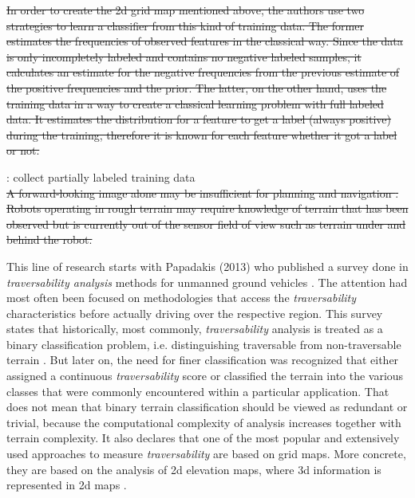 \documentclass[12pt,a4paper]{report}
\newcommand{\term}{\textit}
\begin{document}
	
	
	
	\sout{In order to create the 2d grid map mentioned above, the authors use two 
	strategies to learn a classifier from this kind of 
	training data. The former estimates the frequencies of observed	features in the 
	classical way. Since the data is only incompletely labeled and contains no 
	negative labeled samples, it calculates an estimate for the negative 
	frequencies from the previous estimate of the positive frequencies and the prior. The 
	latter, on the other hand, uses the training data in a way to create a classical 
	learning problem with full labeled data. It estimates the distribution for a 
	feature to get a label (always positive) during the training, therefore it is 
	known for each feature whether it got a label or not.}
	
	\cite{Suger}: collect partially labeled training data
	\\
	
	\sout{A forward-looking image alone may be insufficient for planning and navigation
	\cite{Kweon}. Robots operating in rough terrain may require knowledge of 
	terrain that has been observed but is currently out of the sensor field of
	view such as terrain under and behind the robot.}
	
	This line of research starts with Papadakis (2013) who published a 
	survey done in \term{traversability analysis} methods for unmanned ground vehicles 
	\cite{Papadakis}. 
	The attention had most often been focused on methodologies that access the 
	\term{traversability} characteristics before actually driving over the respective 
	region.
	This survey states that historically, most commonly, \term{traversability} analysis is treated 
	as a binary classification problem, i.e. distinguishing traversable from 
	non-traversable terrain \cite{Suger, Hirose, Wigness}. 
	But later on, the need for finer classification was recognized that either assigned 
	a continuous \term{traversability} score or classified the terrain into the various classes 
	that were commonly encountered within a particular application.
	That does not mean that binary terrain classification should be viewed as redundant
	or trivial, because the computational complexity of analysis increases together 
	with terrain complexity.
	It also declares that one of the most popular and extensively used approaches 
	to measure \term{traversability} are based on grid 
	maps. More concrete, they are based on the analysis of 2d elevation maps, 
	where 3d information is represented in 2d maps \cite{Suger}.
	\\
	
\end{document}
